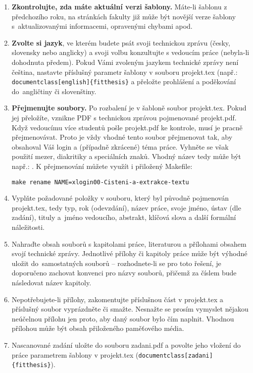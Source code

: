 \begin{enumerate}
  \item \textbf{Zkontrolujte, zda máte aktuální verzi šablony.} Máte-li šablonu z předchozího roku, na stránkách fakulty již může být novější verze šablony s~aktualizovanými informacemi, opravenými chybami apod.
  \item \textbf{Zvolte si jazyk}, ve kterém budete psát svoji technickou zprávu (česky, slovensky nebo anglicky) a svoji volbu konzultujte s vedoucím práce (nebyla-li dohodnuta předem). Pokud Vámi zvoleným jazykem technické zprávy není čeština, nastavte příslušný parametr šablony v souboru projekt.tex (např.: \verb|documentclass[english]{fitthesis}| a přeložte prohlášení a poděkování do~angličtiny či slovenštiny.
  \item \textbf{Přejmenujte soubory.} Po rozbalení je v šabloně soubor projekt.tex. Pokud jej přeložíte, vznikne PDF s technickou zprávou pojmenované projekt.pdf. Když vedoucímu více studentů pošle projekt.pdf ke kontrole, musí je pracně přejmenovávat. Proto je vždy vhodné tento soubor přejmenovat tak, aby obsahoval Váš login a (případně zkrácené) téma práce. Vyhněte se však použití mezer, diakritiky a speciálních znaků. Vhodný název tedy může být např.: . K přejmenování můžete využít i přiložený Makefile:
\begin{verbatim}
make rename NAME=xlogin00-Cisteni-a-extrakce-textu
\end{verbatim}
  \item Vyplňte požadované položky v souboru, který byl původně pojmenován projekt.tex, tedy typ, rok (odevzdání), název práce, svoje jméno, ústav (dle zadání), tituly a~jméno vedoucího, abstrakt, klíčová slova a další formální náležitosti.
  \item Nahraďte obsah souborů s kapitolami práce, literaturou a přílohami obsahem svojí technické zprávy. Jednotlivé přílohy či kapitoly práce může být výhodné uložit do~samostatných souborů -- rozhodnete-li se pro toto řešení, je doporučeno zachovat konvenci pro názvy souborů, přičemž za číslem bude následovat název kapitoly. 
  \item Nepotřebujete-li přílohy, zakomentujte příslušnou část v projekt.tex a příslušný soubor vyprázdněte či smažte. Nesnažte se prosím vymyslet nějakou neúčelnou přílohu jen proto, aby daný soubor bylo čím naplnit. Vhodnou přílohou může být obsah přiloženého paměťového média.
  \item Nascanované zadání uložte do souboru zadani.pdf a povolte jeho vložení do práce parametrem šablony v projekt.tex (\verb|documentclass[zadani]{fitthesis}|).

\end{enumerate}
